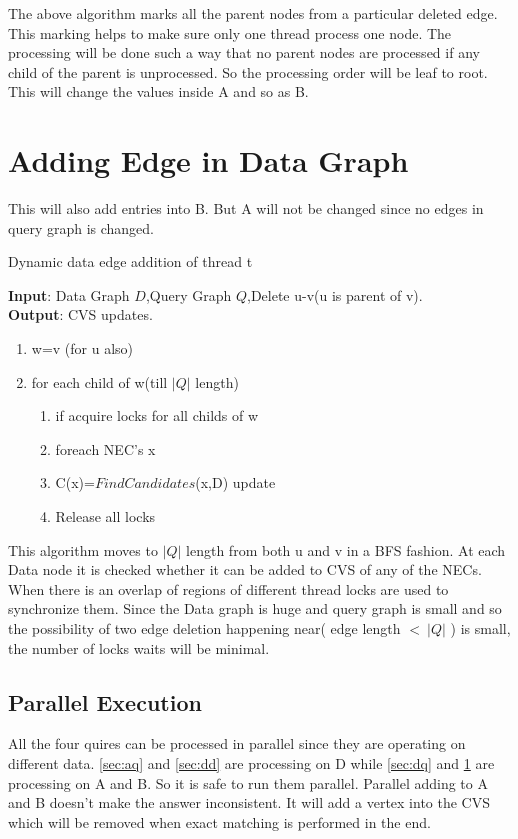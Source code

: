 	\hspace{10mm} The above algorithm marks all the parent nodes from a particular deleted edge. This marking helps to make sure only one thread process one node. The processing will be done such a way that no parent nodes are processed if any  child of the parent is unprocessed. So the processing order will be leaf to root. This will change the values inside A and so as B.
\section{Adding Edge in Data Graph}
 \label{sec:ad}
	\hspace{10mm} This will also add entries into B. But A will not be changed since no edges in query graph is changed. 
	\begin{algorithm}[H]
\caption{Dynamic data edge addition of thread t}
\textbf{Input}: Data Graph $D$,Query Graph $Q$,Delete u-v(u is parent of v).\\
\textbf{Output}: CVS updates.\\
\begin{algorithmic}
 \item \begin{enumerate}
 \item w=v (for u also)
\item for each child of w(till $|Q|$ length)
\begin{enumerate}
\item if acquire locks for all childs of w 
\item foreach NEC's x
\item C(x)=$FindCandidates$(x,D) update
\item Release all locks
\end{enumerate}
\end{enumerate}
\end{algorithmic}
\end{algorithm}
\hspace{10mm} This algorithm moves to  $|Q|$ length from both u and v in a BFS fashion. At each Data node it is checked whether it can be added to CVS of any of the NECs. When there is an overlap of regions of different thread locks are used to synchronize them. Since the Data graph is huge and  query graph is small and so the possibility of two edge deletion happening near( edge length  $< ~|Q|$ ) is small, the number of locks waits will be minimal.
\subsection{Parallel Execution}
\hspace{10mm} All the four quires can be processed in parallel since they are operating on different data. \ref{sec:aq} and \ref{sec:dd} are processing on D while \ref{sec:dq} and \ref{sec:ad} are processing on A and B. So it is safe to run them parallel. Parallel adding to A and B doesn't make the answer inconsistent. It will add a vertex into the CVS which  will be removed when exact matching is performed in the end.
